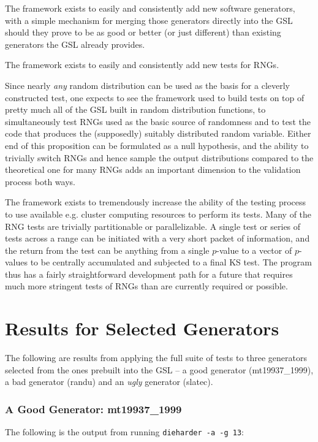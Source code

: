 \documentclass{book}
\begin{document}
The framework exists to easily and consistently add new software
generators, with a simple mechanism for merging those generators
directly into the GSL should they prove to be as good or better (or just
different) than existing generators the GSL already provides.

The framework exists to easily and consistently add new tests for RNGs.

Since nearly {\em any} random distribution can be used as the basis for
a cleverly constructed test, one expects to see the framework used to
build tests on top of pretty much all of the GSL built in random
distribution functions, to simultaneously test RNGs used as the basic
source of randomness and to test the code that produces the (supposedly)
suitably distributed random variable.  Either end of this proposition
can be formulated as a null hypothesis, and the ability to trivially
switch RNGs and hence sample the output distributions compared to the
theoretical one for many RNGs adds an important dimension to the
validation process both ways.

The framework exists to tremendously increase the ability of the testing
process to use available e.g. cluster computing resources to perform its
tests.  Many of the RNG tests are trivially partitionable or
parallelizable.  A single test or series of tests across a range can be
initiated with a very short packet of information, and the return from
the test can be anything from a single $p$-value to a vector of
$p$-values to be centrally accumulated and subjected to a final KS test.
The program thus has a fairly straightforward development path for a
future that requires much more stringent tests of RNGs than are
currently required or possible.

\chapter{Results for Selected Generators}

The following are results from applying the full suite of tests to three
generators selected from the ones prebuilt into the GSL -- a good
generator (mt19937\_1999), a bad generator (randu) and an {\em ugly}
generator (slatec).

\subsection{A Good Generator: mt19937\_1999}

The following is the output from running {\tt dieharder -a -g 13}:
\end{document}
